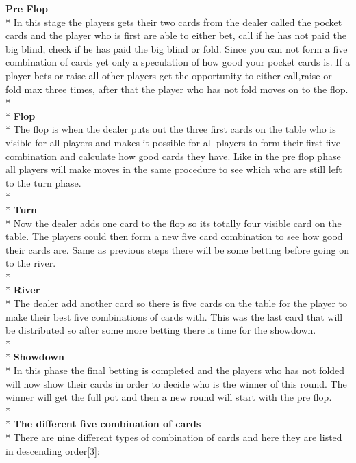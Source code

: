 \documentclass[journal]{vgtc}                %
\begin{document}
\textbf{Pre Flop}\\*
In this stage the players gets their two cards from the dealer called the pocket cards and the player who is first are able to either bet, call if he has not paid the big blind, check if he has paid the big blind or fold. Since you can not form a five combination of cards yet only a speculation of how good your pocket cards is. If a player bets or raise all other players get the opportunity to either call,raise or fold max three times, after that the player who has not fold moves on to the flop.
\\*\\*
\textbf{Flop}\\*
The flop is when the dealer puts out the three first cards on the table who is visible for all players and makes it possible for all players to form their first five combination and calculate how good cards they have. Like in the pre flop phase all players will make moves in the same procedure to see which who are still left to the turn phase.
\\*\\*
\textbf{Turn}\\*
Now the dealer adds one card to the flop so its totally four visible card on the table. The players could then form a new five card combination to see how good their cards are. Same as previous steps there will be some betting before going on to the river.
\\*\\*
\textbf{River}\\*
The dealer add another card so there is five cards on the table for the player to make their best five combinations of cards with. This was the last card that will be distributed so after some more betting there is time for the showdown.
\\*\\*
\textbf{Showdown}\\*
In this phase the final betting is completed and the players who has not folded will now show their cards in order to decide who is the winner of this round. The winner will get the full pot and then a new round will start with the pre flop.
\\*\\*
\textbf{The different five combination of cards}\\*
There are nine different types of combination of cards and here they are listed in descending order[3]:
\end{document}
